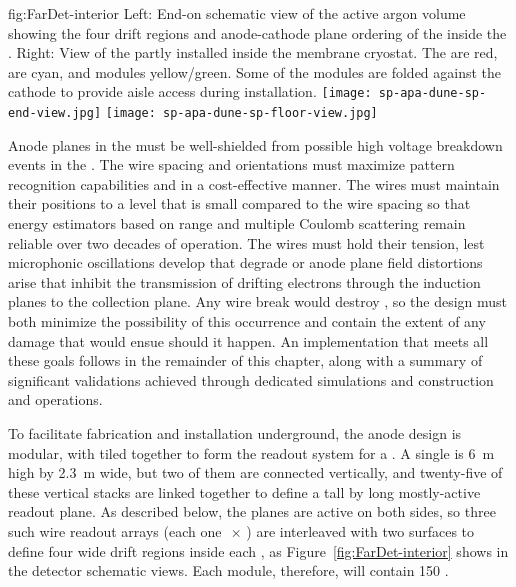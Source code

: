 \begin{dunefigure}{fig:FarDet-interior}
{Left: End-on schematic view of the active argon volume showing the four drift regions and anode-cathode plane ordering of the  inside the . Right: View of the partly installed   inside the membrane cryostat. The  are red,  are cyan, and  modules yellow/green.  Some of the  modules are folded against the cathode to provide aisle access during installation.}
\texttt{[image: sp-apa-dune-sp-end-view.jpg]}\hspace{0.01\textwidth}
\texttt{[image: sp-apa-dune-sp-floor-view.jpg]}
\end{dunefigure}

Anode planes in the  must be well-shielded from possible high voltage breakdown events in the .  The  wire spacing and orientations must maximize pattern recognition capabilities and  in a cost-effective manner.  The  wires must maintain their positions to a level that is small compared to the wire spacing so that energy estimators based on range and multiple Coulomb scattering remain reliable over two decades of operation.  The wires must hold their tension, lest microphonic oscillations develop that degrade  or anode plane field distortions arise that inhibit the transmission of drifting electrons through the induction planes to the collection plane.  Any wire break would destroy , so the  design must both minimize the possibility of this occurrence and contain the extent of any damage that would ensue should it happen.  An  implementation that meets all these goals follows in the remainder of this chapter, along with a summary of significant validations achieved through dedicated simulations and  construction and operations.

To facilitate fabrication and installation underground, the anode design is modular, with  tiled together to form the readout system for a \nominalmodsize {}. A single  is \SI{6}{m} high by \SI{2.3}{m} wide, but two of them are connected vertically, and twenty-five of these vertical stacks are linked together to define a \tpcheight %
tall by \sptpclen %
long mostly-active readout plane.  As described below, the planes are active on both sides, so three such wire readout arrays (each one \tpcheight$\,\times\,$\sptpclen) %
are interleaved with two  surfaces to define four \spmaxdrift %
wide drift regions inside each , as Figure~\ref{fig:FarDet-interior} shows in the detector schematic views. Each  \nominalmodsize module, therefore, will contain 150 .

